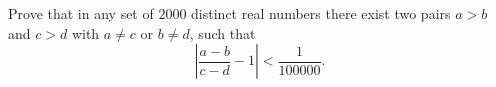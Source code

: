 Prove that in any set of $2000$ distinct real numbers there exist two pairs $a>b$ and $c>d$ with $a \neq c$ or $b \neq d $,  such that  \[ \left| \frac{a-b}{c-d} - 1 \right|< \frac{1}{100000}.\]
